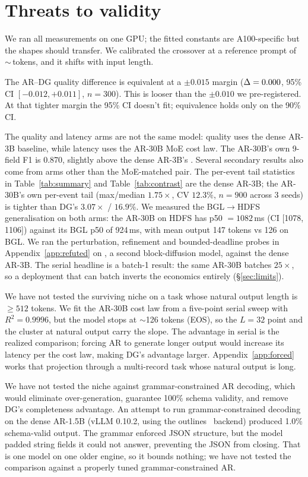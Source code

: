 \section{Threats to validity}
\label{sec:threats}

We ran all measurements on one GPU; the fitted constants are
A100-specific but the shapes should transfer. We calibrated the
crossover at a reference prompt of $\sim$\,tokens, and it
shifts with input length.

The AR--DG quality difference is equivalent at a $\pm 0.015$ margin
($\Delta = 0.000$, 95\% CI $[-0.012, +0.011]$, $n = 300$).
This is looser than the $\pm 0.010$ we pre-registered. At that
tighter margin the 95\% CI doesn't fit; equivalence holds only on
the 90\% CI.

The quality and latency arms are not the same model: quality uses the
dense AR-3B baseline, while latency uses the AR-30B MoE cost law.
The AR-30B's own 9-field F1 is 0.870, slightly above the dense
AR-3B's \arThreeBFnine. Several secondary results also come from arms
other than the MoE-matched pair. The per-event tail statistics in
Table~\ref{tab:summary} and Table~\ref{tab:contrast} are the dense
AR-3B; the AR-30B's own per-event tail (max/median $1.75\times$,
CV $12.3\%$, $n{=}900$ across 3 seeds) is tighter than DG's
$3.07\times$ / $16.9\%$. We measured the BGL$\to$HDFS generalisation
on both arms: the AR-30B on HDFS has p50 $= 1082$\,ms
(CI [1078, 1106]) against its BGL p50 of 924\,ms, with mean output
147 tokens vs 126 on BGL. We ran the
perturbation, refinement and bounded-deadline probes in
Appendix~\ref{app:refuted} on \LLaDA, a second block-diffusion
model, against the dense AR-3B. The serial headline is a batch-1
result: the same AR-30B batches $25\times$, so a deployment that can
batch inverts the economics entirely (\S\ref{sec:limits}).

We have not tested the surviving niche on a task whose natural output
length is $\geq 512$ tokens. We fit the AR-30B cost law from a
five-point serial sweep with $R^2 = 0.9996$, but the model stops at
$\sim$126 tokens (EOS), so the $L{=}32$ point and the cluster at
natural output carry the slope. The advantage in serial is the
realized comparison; forcing AR to generate longer output would
increase its latency per the cost law, making DG's advantage larger.
Appendix~\ref{app:forced} works that projection through a multi-record
task whose natural output is long.

We have not tested the niche against grammar-constrained AR decoding,
which would eliminate over-generation, guarantee 100\% schema
validity, and remove DG's completeness advantage. An attempt to run
grammar-constrained decoding on the dense AR-1.5B (vLLM 0.10.2, using
the outlines~\cite{outlines2024} backend) produced 1.0\% schema-valid
output. The grammar enforced JSON structure, but the model padded
string fields it could not answer, preventing the JSON from closing.
That is one model on one older engine, so it bounds nothing; we have
not tested the comparison against a properly tuned grammar-constrained
AR.

